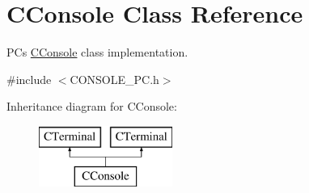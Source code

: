 \hypertarget{class_c_console}{}\section{C\+Console Class Reference}
\label{class_c_console}


PC\textquotesingle{}s \mbox{\hyperlink{class_c_console}{C\+Console}} class implementation.  




{\ttfamily \#include $<$C\+O\+N\+S\+O\+L\+E\+\_\+\+P\+C.\+h$>$}

Inheritance diagram for C\+Console\+:\begin{figure}[H]
\begin{center}
\leavevmode
\includegraphics[height=2.000000cm]{class_c_console}
\end{center}
\end{figure}
